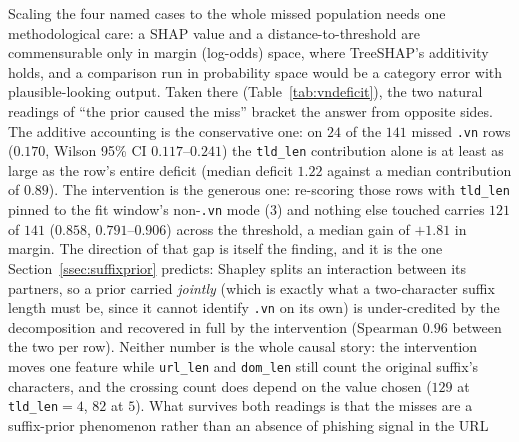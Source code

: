 Scaling the four named cases to the whole missed population needs one methodological care: a SHAP value and a distance-to-threshold are commensurable only in margin (log-odds) space, where TreeSHAP's additivity holds, and a comparison run in probability space would be a category error with plausible-looking output. Taken there (Table~\ref{tab:vndeficit}), the two natural readings of ``the prior caused the miss'' bracket the answer from opposite sides. The additive accounting is the conservative one: on $24$ of the $141$ missed \texttt{.vn} rows ($0.170$, Wilson 95\% CI $0.117$--$0.241$) the \texttt{tld\_len} contribution alone is at least as large as the row's entire deficit (median deficit $1.22$ against a median contribution of $0.89$). The intervention is the generous one: re-scoring those rows with \texttt{tld\_len} pinned to the fit window's non-\texttt{.vn} mode ($3$) and nothing else touched carries $121$ of $141$ ($0.858$, $0.791$--$0.906$) across the threshold, a median gain of $+1.81$ in margin. The direction of that gap is itself the finding, and it is the one Section~\ref{ssec:suffixprior} predicts: Shapley splits an interaction between its partners, so a prior carried \emph{jointly} (which is exactly what a two-character suffix length must be, since it cannot identify \texttt{.vn} on its own) is under-credited by the decomposition and recovered in full by the intervention (Spearman $0.96$ between the two per row). Neither number is the whole causal story: the intervention moves one feature while \texttt{url\_len} and \texttt{dom\_len} still count the original suffix's characters, and the crossing count does depend on the value chosen ($129$ at \texttt{tld\_len}$=4$, $82$ at $5$). What survives both readings is that the misses are a suffix-prior phenomenon rather than an absence of phishing signal in the URL%
